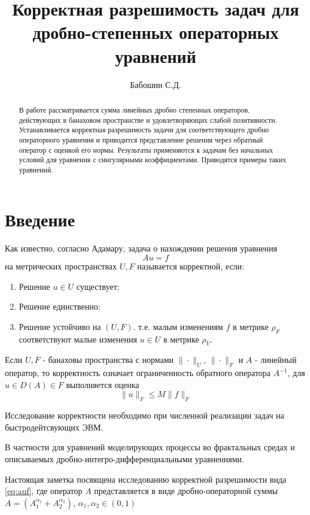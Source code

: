 \documentclass{cmfnre}
\title{Корректная разрешимость задач для дробно-степенных операторных уравнений}
\author{Бабошин С.Д.}
\theoremstyle{plain}
\numberwithin{equation}{section}
\begin{document}
\begin{abstract}
    В работе рассматривается сумма линейных дробно степенных операторов, действующих в банаховом пространстве
    и удовлетворяющих слабой позитивности. Устанавливается корректная разрешимость задачи для соответствующего
    дробно операторного уравнения и приводится представление решения через обратный оператор с оценкой его нормы.
    Результаты применяются к задачам без начальных условий для уравнения с сингулярными коэффициентами.
    Приводятся примеры таких уравнений.
\end{abstract}

\maketitle
\tableofcontents

\section{Введение}

Как известно, согласно \cite{Krein} Адамару, задача о нахождении решения уравнения
\begin{equation}
    \label{eq:auf}
    Au = f
\end{equation}
на метрических пространствах $U, F$ называется корректной, если:
\begin{enumerate}
    \item Решение $u \in U$ существует;
    \item Решение единственно;
    \item Решение устойчиво на $(U, F)$. т.е. малым изменениям $f$ в метрике $\rho_F$
    соответствуют малые изменения $u \in U$ в метрике $\rho_V$.
\end{enumerate}

Если $U, F$ - банаховы пространства с нормами $\|\cdot\|_U$, $\|\cdot\|_F$ и $A$ - линейный
оператор, то корректность означает ограниченность обратного оператора $A^{-1}$, для
$u \in D(A) \in F$ выполняется оценка
\begin{equation}
    \|u\|_F \le M\|f\|_F
\end{equation}

Исследование корректности необходимо при численной реализации задач на быстро\-дейтсвующих ЭВМ.

В частности для уравнений моделирующих процессы во фрактальных средах и описываемых дробно-интегро-дифференциальными
уравнениями.

Настоящая заметка посвящена исследованию корректной разрешимости вида \eqref{eq:auf}, где оператор
$A$ представляется в виде дробно-операторной суммы
$A = (A_1^{\alpha_1} + A_2^{\alpha_2})$, $\alpha_1, \alpha_2 \in (0,1)$
\end{document}
